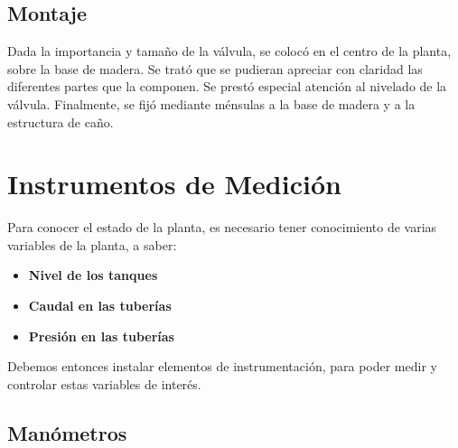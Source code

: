 \subsection{Montaje}
Dada la importancia y tamaño de la válvula, se colocó en el centro de
la planta, sobre la base de madera. Se trató que se pudieran apreciar
con claridad las diferentes partes que la componen.
Se prestó especial atención al nivelado de la válvula.
Finalmente, se fijó mediante ménsulas a la base de madera y a la estructura
de caño.

\section{Instrumentos de Medición}
\label{sec:InstrumentosMedicion}
Para conocer el estado de la planta, es necesario tener conocimiento de varias
variables de la planta, a saber:
\begin{itemize}
 \item \textbf{Nivel de los tanques}
 \item \textbf{Caudal en las tuberías}
 \item \textbf{Presión en las tuberías}
\end{itemize}
Debemos entonces instalar elementos de instrumentación, para poder
medir y controlar estas variables de interés.

\subsection{Manómetros}
\label{subsec:Manometros}

